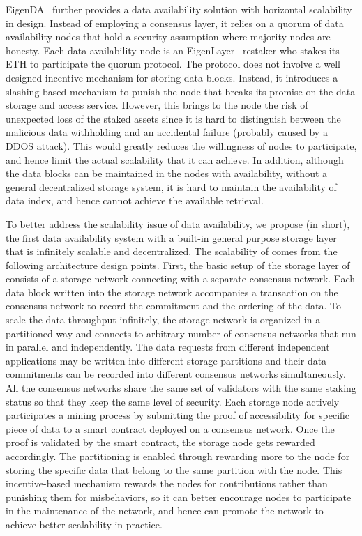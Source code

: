 EigenDA~\cite{eigenda} further provides a data availability solution with horizontal scalability in design. Instead of employing a consensus layer, it relies on a quorum of data availability nodes that hold a security assumption where majority nodes are honesty. Each data availability node is an EigenLayer~\cite{eigenlayer} restaker who stakes its ETH to participate the quorum protocol. The protocol does not involve a well designed incentive mechanism for storing data blocks. Instead, it introduces a slashing-based mechanism to punish the node that breaks its promise on the data storage and access service. However, this brings to the node the risk of unexpected loss of the staked assets since it is hard to distinguish between the malicious data withholding and an accidental failure (probably caused by a DDOS attack). This would greatly reduces the willingness of nodes to participate, and hence limit the actual scalability that it can achieve. 
In addition, although the data blocks can be maintained in the nodes with availability, without a general decentralized storage system, it is hard to maintain the availability of data index, and hence cannot achieve the available retrieval.

To better address the scalability issue of data availability, we propose \project (\projabbrev in short), the first data availability system with a built-in general purpose storage layer that is infinitely scalable and decentralized. The scalability of \projabbrev comes from the following architecture design points. 
First, the basic setup of the storage layer of \projabbrev consists of a storage network connecting with a separate consensus network. Each data block written into the storage network accompanies a transaction on the consensus network to record the commitment and the ordering of the data. 
To scale the data throughput infinitely, the storage network is organized in a partitioned way and connects to arbitrary number of consensus networks that run in parallel and independently. 
The data requests from different independent applications may be written into different storage partitions and their data commitments can be recorded into different consensus networks simultaneously.
All the consensus networks share the same set of validators with the same staking status so that they keep the same level of security.    
Each storage node actively participates a mining process by submitting the proof of accessibility for specific piece of data to a smart contract deployed on a consensus network. Once the proof is validated by the smart contract, the storage node gets rewarded accordingly. 
The partitioning is enabled through rewarding more to the node for storing the specific data that belong to the same partition with the node. This incentive-based mechanism rewards the nodes for contributions rather than punishing them for misbehaviors, so it can better encourage nodes to participate in the maintenance of the network, and hence can promote the network to achieve better scalability in practice.

